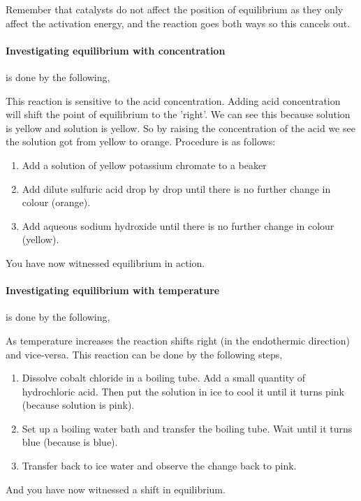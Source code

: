 \documentclass[11pt,a4paper]{memoir}
\begin{document}
	Remember that catalysts do not affect the position of equilibrium as they only affect the activation energy, and the reaction goes both ways so this cancels out.
	
	\paragraph{Investigating equilibrium with concentration} is done by the following,
	
	\begin{center}
	\end{center}
	This reaction is sensitive to the acid concentration. Adding acid concentration will shift the point of equilibrium to the 'right'. We can see this because  solution is yellow and  solution is yellow. So by raising the concentration of the acid we see the solution got from yellow to orange.
	Procedure is as follows:
	\begin{enumerate}
		\item Add a solution of yellow potassium chromate to a beaker
		\item Add dilute sulfuric acid drop by drop until there is no further change in colour (orange).
		\item Add aqueous sodium hydroxide until there is no further change in colour (yellow).
	\end{enumerate}
	You have now witnessed equilibrium in action.
	\paragraph{Investigating equilibrium with temperature} is done by the following,
	
	\begin{center}
	\end{center}
	As temperature increases the reaction shifts right (in the endothermic direction) and vice-versa. This reaction can be done by the following steps,
	
	\begin{enumerate}
		\item Dissolve cobalt chloride in a boiling tube. Add a small quantity of hydrochloric acid. Then put the solution in ice to cool it until it turns pink (because  solution is pink).
		\item Set up a boiling water bath and transfer the boiling tube. Wait until it turns blue (because  is blue).
		\item Transfer back to ice water and observe the change back to pink.
	\end{enumerate}
	And you have now witnessed a shift in equilibrium.
	
\end{document}
